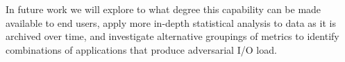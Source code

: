 In future work we will explore to what degree this capability can be made
available to end users, apply more in-depth statistical analysis to data
as it is archived over time, and investigate alternative groupings of
metrics to identify combinations of applications that produce
adversarial I/O load.





